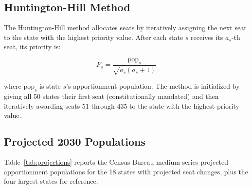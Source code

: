 \label{sec:apportionment}

\subsection{Huntington-Hill Method}

The Huntington-Hill method allocates seats by iteratively assigning the next seat to
the state with the highest priority value. After each state $s$ receives its $a_s$-th
seat, its priority is:

\begin{equation}
P_s = \frac{\text{pop}_s}{\sqrt{a_s(a_s + 1)}}
\end{equation}

where $\text{pop}_s$ is state $s$'s apportionment population. The method is initialized
by giving all 50 states their first seat (constitutionally mandated) and then iteratively
awarding seats 51 through 435 to the state with the highest priority value.

\subsection{Projected 2030 Populations}

Table~\ref{tab:projections} reports the Census Bureau medium-series projected
apportionment populations for the 18 states with projected seat changes, plus the
four largest states for reference.


